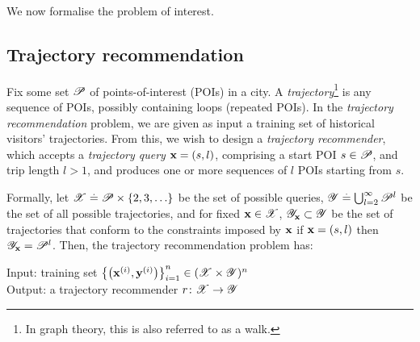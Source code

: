 
We now formalise the problem of interest.

%
\subsection{Trajectory recommendation}

Fix some set $\mathscr{P}$ of points-of-interest (POIs) in a city.
A \emph{trajectory}\footnote{In graph theory, this is also referred to as a walk.} is any sequence of POIs, possibly containing loops (repeated POIs).
In the \emph{trajectory recommendation} problem, we are given as input a training set of historical visitors' trajectories.
From this, we wish to design a \emph{trajectory recommender}, which accepts a
\emph{trajectory query} $\mathbf{x} = (s, l)$, comprising a start POI $s \in \mathscr{P}$, and trip length $l \!>\! 1$, %
and produces one or more sequences of $l$ POIs starting from $s$. %

Formally, let $\mathscr{X} \stackrel{.}{=} \mathscr{P} \times \{ 2, 3, \ldots \}$ be the set of possible queries,
$\mathscr{Y} \stackrel{.}{=} \bigcup_{l = 2}^\infty \mathscr{P}^l$ be the set of all possible trajectories,
and for fixed $\mathbf{x} \in \mathscr{X}$, $\mathscr{Y}_{\mathbf{x}} \subset \mathscr{Y}$ be the set of trajectories that conform to the constraints imposed by $\mathbf{x}$
\ie if $\mathbf{x} = (s, l)$ then $\mathscr{Y}_{\mathbf{x}} = \mathscr{P}^l$.
Then, the {trajectory recommendation} problem has:

\vspace{0.5\baselineskip}

\begin{mdframed}[innertopmargin=3pt,innerbottommargin=3pt,skipbelow=5pt,roundcorner=8pt,backgroundcolor=red!3,topline=false,rightline=false,leftline=false,bottomline=false]
{\sc Input}: training set $\left\{ \left( \mathbf{x}^{(i)}, \mathbf{y}^{(i)} \right) \right\}_{i = 1}^n \in ( \mathscr{X} \times \mathscr{Y} )^n$ \\
{\sc Output}: a trajectory recommender $r \colon \mathscr{X} \to \mathscr{Y}$ 
\end{mdframed}

\vspace{0.5\baselineskip}

